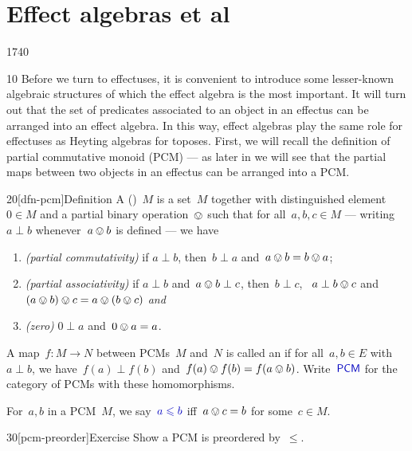 \section{Effect algebras et al}
\begin{parsec}{1740}%
\begin{point}{10}%
Before we turn to effectuses,
    it is convenient to introduce some lesser-known algebraic structures
    of which the effect algebra is the most important.
It will turn out that the set of predicates associated to an object in
    an effectus can be arranged into an effect algebra.
In this way, effect algebras play the same role
    for effectuses as Heyting algebras for toposes.
    First, we will recall the definition of partial commutative monoid (PCM)
    --- as later in  
    we will see that the partial maps between
    two objects in an effectus can be arranged into a PCM.
\end{point}
\begin{point}{20}[dfn-pcm]{Definition}%
    A  ()~$M$
        is a set~$M$ together with distinguished element~$0 \in M$
        and a partial binary operation~$\ovee$ such that
        for all~$a,b,c \in M$ 
        --- writing~$a \perp b$ whenever~$a \ovee b$ is defined
        --- we have
\begin{enumerate}
    \item \emph{(partial commutativity)}
        if $a \perp b$, then~$b \perp a$ and~$a \ovee b = b \ovee a$;
    \item \emph{(partial associativity)}
        if $a \perp b$ and~$a \ovee b \perp c$,
        then~$b \perp c$, ~$a \perp b \ovee c$
            and~$(a \ovee b) \ovee c = a \ovee (b \ovee c)$ \emph{and}
    \item \emph{(zero)}
        $0 \perp a$ and~$0 \ovee a = a$.
\end{enumerate}
A map~$f\colon M \to N$
    between PCMs~$M$ and~$N$
    is called an 
    if for all~$a, b \in E$
    with~$a \perp b$,
    we have~$f(a) \perp f(b)$
    and~$f(a) \ovee f(b) = f(a \ovee b)$.
Write~$\Define{\textsf{PCM}}$ for the category
    of PCMs with these homomorphisms.

For~$a,b$ in a PCM~$M$,
    we say~$\Define{a \leq b}$
    iff~$a \ovee c = b$ for some~$c \in M$.
\end{point}
\begin{point}{30}[pcm-preorder]{Exercise}%
Show a PCM is preordered by~$\leq$.
\end{point}
\end{parsec}

